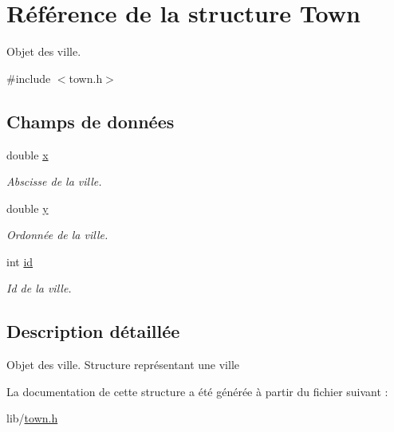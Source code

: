 \hypertarget{structTown}{
\section{Référence de la structure Town}
\label{structTown}
}


Objet des ville.  




{\ttfamily \#include $<$town.h$>$}

\subsection*{Champs de données}
\begin{DoxyCompactItemize}
\item 
\hypertarget{structTown_a948c5eb18c3ab1588bea9146ff01eb1b}{
double \hyperlink{structTown_a948c5eb18c3ab1588bea9146ff01eb1b}{x}}
\label{structTown_a948c5eb18c3ab1588bea9146ff01eb1b}

\begin{DoxyCompactList}\small\item\em Abscisse de la ville. \item\end{DoxyCompactList}\item 
\hypertarget{structTown_ac5e283fe38ed91f71711a5b9bc6488f7}{
double \hyperlink{structTown_ac5e283fe38ed91f71711a5b9bc6488f7}{y}}
\label{structTown_ac5e283fe38ed91f71711a5b9bc6488f7}

\begin{DoxyCompactList}\small\item\em Ordonnée de la ville. \item\end{DoxyCompactList}\item 
\hypertarget{structTown_a3fd25ddbb4f43f39fb8ccd507c8b8b2b}{
int \hyperlink{structTown_a3fd25ddbb4f43f39fb8ccd507c8b8b2b}{id}}
\label{structTown_a3fd25ddbb4f43f39fb8ccd507c8b8b2b}

\begin{DoxyCompactList}\small\item\em Id de la ville. \item\end{DoxyCompactList}\end{DoxyCompactItemize}


\subsection{Description détaillée}
Objet des ville. Structure représentant une ville 

La documentation de cette structure a été générée à partir du fichier suivant :\begin{DoxyCompactItemize}
\item 
lib/\hyperlink{town_8h}{town.h}\end{DoxyCompactItemize}
